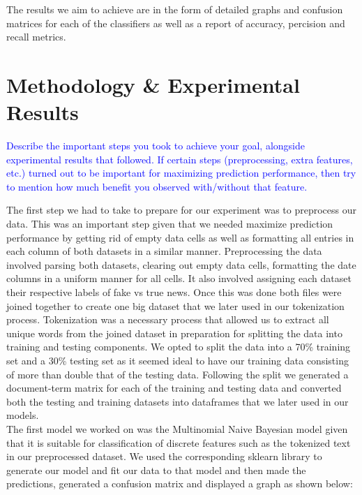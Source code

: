 \documentclass[10pt,twocolumn,letterpaper]{article}
\begin{document}
The results we aim to achieve are in the form of detailed graphs and confusion matrices for each of the classifiers as well as a report of accuracy, percision and recall metrics. 


\section{Methodology \& Experimental Results}

\textcolor{blue}{Describe the important steps you took to achieve your goal, alongside experimental results that followed. If certain steps (preprocessing, extra features, etc.) turned out to be important for maximizing prediction performance, then try to mention how much benefit you observed with/without that feature.}

The first step we had to take to prepare for our experiment was to preprocess our data. This was an important step given that we needed maximize prediction performance by getting rid of empty data cells as well as formatting all entries in each column of both datasets in a similar manner. Preprocessing the data involved parsing both datasets, clearing out empty data cells, formatting the date columns in a uniform manner for all cells. It also involved assigning each dataset their respective labels of fake vs true news. Once this was done  both files were joined together to create one big dataset that we later used in our tokenization process. Tokenization was a necessary process that allowed us to extract all unique words from the joined dataset in preparation for splitting the data into training and testing components. We opted to split the data into a 70\% training set and a 30\% testing set as it seemed ideal to have our training data consisting of more than double that of the testing data. Following the split we generated a document-term matrix for each of the training and testing data and converted both the testing and training datasets into dataframes that we later used in our models. \\

The first model we  worked on was the Multinomial Naive Bayesian model given that it is suitable for classification of discrete features such as the tokenized text in our preprocessed dataset. We used the corresponding sklearn library to generate our model and fit our data to that model and then made the predictions, generated a confusion matrix and displayed a graph as shown below:
\end{document}
